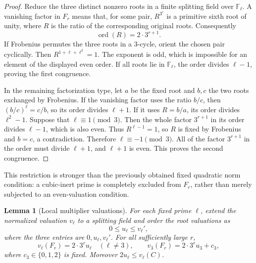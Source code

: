 \documentclass[11pt,a4paper]{article}
\newtheorem{lemma}[theorem]{Lemma}
\theoremstyle{definition}
\theoremstyle{remark}
\numberwithin{equation}{section}
\begin{document}
\begin{proof}
Reduce the three distinct nonzero roots in a finite splitting field over
$\mathbb F_\ell$.  A vanishing factor in $F_r$ means that, for some pair,
$R^{3^r}$ is a primitive sixth root of unity, where $R$ is the ratio of
the corresponding original roots.  Consequently
\[
 \operatorname{ord}(R)=2\cdot3^{r+1}.
\]
If Frobenius permutes the three roots in a $3$-cycle, orient the chosen
pair cyclically.  Then
$R^{1+\ell+\ell^2}=1$.  The exponent is odd, which is impossible for an
element of the displayed even order.  If all roots lie in $\mathbb F_\ell$,
the order divides $\ell-1$, proving the first congruence.

In the remaining factorization type, let $a$ be the fixed root and $b,c$
the two roots exchanged by Frobenius.  If the vanishing factor uses the
ratio $b/c$, then $(b/c)^\ell=c/b$, so its order divides $\ell+1$.
If it uses $R=b/a$, its order divides $\ell^2-1$.  Suppose that
$\ell\equiv1\pmod3$.  Then the whole factor $3^{r+1}$ in its order divides
$\ell-1$, which is also even.  Thus $R^{\ell-1}=1$, so $R$ is fixed by
Frobenius and $b=c$, a contradiction.
Therefore $\ell\equiv-1\pmod3$.  All of the factor $3^{r+1}$ in the order
must divide $\ell+1$, and $\ell+1$ is even.  This proves the second
congruence.
\end{proof}

This restriction is stronger than the previously obtained fixed quadratic
norm condition: a cubic-inert prime is completely excluded from $F_r$,
rather than merely subjected to an even-valuation condition.

\begin{lemma}[Local multiplier valuations]\label{mil:lem:cubic-local-valuations}
For each fixed prime $\ell$, extend the normalized valuation $v_\ell$ to a
splitting field and order the root valuations as
\[
 0\leq u_\ell\leq v_\ell',
\]
where the three entries are $0,u_\ell,v_\ell'$.
For all sufficiently large $r$,
\[
 v_\ell(F_r)=2\cdot3^r u_\ell\quad(\ell\ne3),\qquad
 v_3(F_r)=2\cdot3^r u_3+c_3,
\]
where $c_3\in\{0,1,2\}$ is fixed.  Moreover
$2u_\ell\leq v_\ell(C)$.
\end{lemma}
\end{document}
